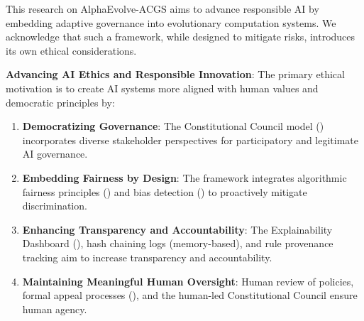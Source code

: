 \documentclass[manuscript,screen,9pt]{acmart}
\begin{document}
This research on AlphaEvolve-ACGS aims to advance responsible AI by embedding adaptive governance into evolutionary computation systems. We acknowledge that such a framework, while designed to mitigate risks, introduces its own ethical considerations.

\textbf{Advancing AI Ethics and Responsible Innovation}:
The primary ethical motivation is to create AI systems more aligned with human values and democratic principles by:
\begin{enumerate}[leftmargin=*,itemsep=1pt,parsep=1pt]
	\item \textbf{Democratizing Governance}: The Constitutional Council model () incorporates diverse stakeholder perspectives for participatory and legitimate AI governance.
	\item \textbf{Embedding Fairness by Design}: The framework integrates algorithmic fairness principles () and bias detection () to proactively mitigate discrimination.
	\item \textbf{Enhancing Transparency and Accountability}: The Explainability Dashboard (), hash chaining logs (memory-based), and rule provenance tracking aim to increase transparency and accountability.
	\item \textbf{Maintaining Meaningful Human Oversight}: Human review of policies, formal appeal processes (), and the human-led Constitutional Council ensure human agency.
\end{enumerate}
\end{document}
